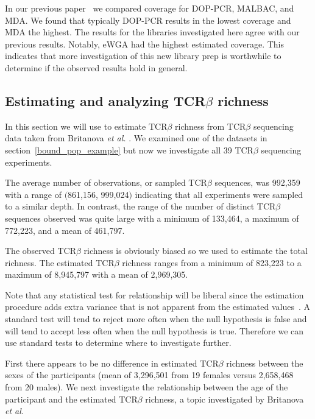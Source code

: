 \documentclass[11pt, titlepage]{article}
\begin{document}
In our previous paper~\cite{daley2014modeling}
we compared  coverage for DOP-PCR, MALBAC,
and MDA.  We found that typically DOP-PCR results in the
lowest coverage and MDA the highest.
The results for the libraries investigated here
agree with our previous results.  
Notably, eWGA had the highest estimated
coverage.  This indicates that more investigation of
this new library prep is worthwhile to determine if the
observed results hold in general.

\newpage 

\subsection*{Estimating and analyzing TCR$\beta$ richness}

In this section we will use 
to estimate TCR$\beta$ richness from TCR$\beta$
sequencing data taken from Britanova {\em et al.}
\cite{britanova2014age}.  We examined one
of the datasets in section~\ref{bound_pop_example}
but now we investigate all 39 TCR$\beta$ sequencing
experiments.

The average number of observations, or sampled
TCR$\beta$ sequences, was 992,359 with a
range of  $($861,156, 999,024$)$
indicating that all experiments were sampled to a similar
depth.  
In contrast, the range of the number of distinct TCR$\beta$
sequences observed was quite large with a minimum of
133,464, a maximum of 772,223, and a mean of 461,797.  

The observed TCR$\beta$ richness is obviously biased so 
we used  to estimate the total richness.
The estimated TCR$\beta$ richness ranges from a minimum
of 823,223 to a maximum of 8,945,797 with a mean
of 2,969,305.  

Note that any statistical test for relationship will be liberal
since the estimation procedure adds extra variance that is not
apparent from the estimated values~\cite{willis2015inference}.
A standard test will tend to reject more often when the
null hypothesis is false and will tend to accept less often
when the null hypothesis is true.
Therefore we can use standard tests to determine
where to investigate further.

First there appears to be no difference in 
estimated TCR$\beta$ richness between the sexes
of the participants (mean of 3,296,501 from 19 females
versus 2,658,468 from 20 males).
We next investigate the relationship between the age
of the participant and the estimated TCR$\beta$ richness,
a topic investigated by Britanova {\em et al.}
\end{document}

